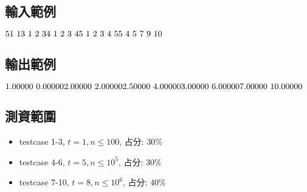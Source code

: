 \documentclass{article}
\begin{document}
\begin{CJK*}{UTF8}{bsmi}
\subsection*{輸入範例}
$5\\1\ 1\\3\ 1\ 2\ 3\\4\ 1\ 2\ 3\ 4\\5\ 1\ 2\ 3\ 4\ 5\\5\ 4\ 5\ 7\ 9\ 10$

\subsection*{輸出範例}
$1.00000\ 0.00000\\2.00000\ 2.00000\\2.50000\ 4.00000\\3.00000\ 6.00000\\7.00000\ 10.00000$

\subsection*{測資範圍}
\begin{itemize}
    \item testcase 1-3, $t=1,n\leq100$, 占分: $30\%$
    \item testcase 4-6, $t=5,n\leq10^5$, 占分: $30\%$
    \item testcase 7-10, $t=8, n\leq10^6$, 占分: $40\%$
\end{itemize}

\end{CJK*}
\end{document}
